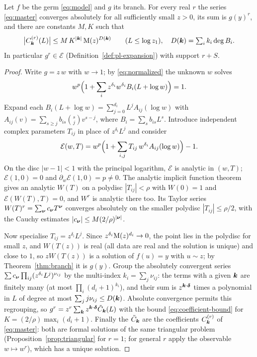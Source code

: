 \begin{theorem}[Convergence]
\label{thm:convergence}
Let $f$ be the germ \eqref{eq:model} and $g$ its branch. For every real $r$ the series \eqref{eq:master} converges absolutely for all sufficiently small $z>0$, its sum is $g(y)^r$, and there are constants $M,K$ such that
\begin{equation}
 \bigl|C^{(r)}_{\boldsymbol k}(L)\bigr|\le M\,K^{|\boldsymbol k|}\,\mathrm M(z)^{D(\boldsymbol k)}\qquad(L\le\log z_1),\quad D(\boldsymbol k)=\textstyle\sum_ik_i\deg B_i .
 \label{eq:coefficient-bound}
\end{equation}
In particular $g^r\in\mathcal E$ (Definition~\ref{def:pl-expansion}) with support $r+S$.
\end{theorem}
\begin{proof}
Write $g=z\,w$ with $w\to1$; by \eqref{eq:normalized} the unknown $w$ solves
\[
 w^p\Bigl(1+\sum_iz^{\delta_i}w^{\delta_i}B_i(L+\log w)\Bigr)=1 .
\]
Expand each $B_i(L+\log w)=\sum_{j=0}^{d_i}L^jA_{ij}(\log w)$ with $A_{ij}(v)=\sum_{s\ge j}b_{is}\binom sjv^{s-j}$, where $B_i=\sum_sb_{is}L^s$. Introduce independent complex parameters $T_{ij}$ in place of $z^{\delta_i}L^j$ and consider
\begin{equation}
 \mathcal E(w,T)=w^p\Bigl(1+\sum_{i,j}T_{ij}\,w^{\delta_i}A_{ij}(\log w)\Bigr)-1 .
 \label{eq:parametric}
\end{equation}
On the disc $|w-1|<1$ with the principal logarithm, $\mathcal E$ is analytic in $(w,T)$; $\mathcal E(1,0)=0$ and $\partial_w\mathcal E(1,0)=p\ne0$. The analytic implicit function theorem gives an analytic $W(T)$ on a polydisc $|T_{ij}|<\rho$ with $W(0)=1$ and $\mathcal E(W(T),T)=0$, and $W^r$ is analytic there too. Its Taylor series $W(T)^r=\sum_{\boldsymbol\nu}c_{\boldsymbol\nu}T^{\boldsymbol\nu}$ converges absolutely on the smaller polydisc $|T_{ij}|\le\rho/2$, with the Cauchy estimates $|c_{\boldsymbol\nu}|\le M(2/\rho)^{|\boldsymbol\nu|}$.

Now specialise $T_{ij}=z^{\delta_i}L^j$. Since $z^{\delta_i}\mathrm M(z)^{d_i}\to0$, the point lies in the polydisc for small $z$, and $W(T(z))$ is real (all data are real and the solution is unique) and close to $1$, so $zW(T(z))$ is a solution of $f(u)=y$ with $u\sim z$; by Theorem~\ref{thm:branch} it is $g(y)$. Group the absolutely convergent series $\sum c_{\boldsymbol\nu}\prod_{ij}(z^{\delta_i}L^j)^{\nu_{ij}}$ by the multi-index $k_i=\sum_j\nu_{ij}$: the terms with a given $\boldsymbol k$ are finitely many (at most $\prod_i(d_i+1)^{k_i}$), and their sum is $z^{\boldsymbol k\cdot\boldsymbol\delta}$ times a polynomial in $L$ of degree at most $\sum_j j\nu_{ij}\le D(\boldsymbol k)$. Absolute convergence permits this regrouping, so $g^r=z^r\sum_{\boldsymbol k}z^{\boldsymbol k\cdot\boldsymbol\delta}\tilde C_{\boldsymbol k}(L)$ with the bound \eqref{eq:coefficient-bound} for $K=(2/\rho)\max_i(d_i+1)$. Finally the $\tilde C_{\boldsymbol k}$ are the coefficients $C^{(r)}_{\boldsymbol k}$ of \eqref{eq:master}: both are formal solutions of the same triangular problem (Proposition~\ref{prop:triangular} for $r=1$; for general $r$ apply the observable $w\mapsto w^r$), which has a unique solution.
\end{proof}

